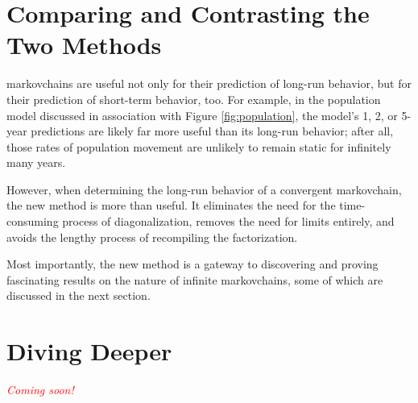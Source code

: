 \documentclass[titlepage]{article}
\begin{document}
\section{Comparing and Contrasting the Two Methods}
\Glspl{markovchain} are useful not only for their prediction of long-run behavior, but for their prediction of short-term behavior, too. For example, in the population model discussed in association with Figure \ref{fig:population}, the model's 1, 2, or 5-year predictions are likely far more useful than its long-run behavior; after all, those rates of population movement are unlikely to remain static for infinitely many years.\par
However, when determining the long-run behavior of a convergent \Gls{markovchain}, the new method is more than useful. It eliminates the need for the time-consuming process of diagonalization, removes the need for limits entirely, and avoids the lengthy process of recompiling the factorization.\par
Most importantly, the new method is a gateway to discovering and proving fascinating results on the nature of infinite \Glspl{markovchain}, some of which are discussed in the next section.
\newpage



\section{Diving Deeper}
\textcolor{red}{\textit{Coming soon!}}
\newpage



\printglossaries
\newpage





\end{document}
